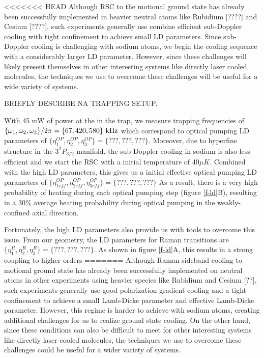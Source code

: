 \documentclass[aps,prl,twocolumn,groupedaddress]{revtex4-1}
\begin{document}
<<<<<<< HEAD
Although RSC to the motional ground state has already been successfully
implemented in heavier neutral atoms like Rubidium [????]
and Cesium [????], such experiments generally use combine efficient sub-Doppler cooling
with tight confinement to achieve small LD parameters.
Since sub-Doppler cooling is challenging with sodium atoms, we begin the cooling sequence with a considerably larger LD parameter.  However, since these challenges will likely present themselves in other interesting systems like directly laser cooled molecules, the techniques we use to overcome these challenges will be useful for a wide variety of systems.

BRIEFLY DESCRIBE NA TRAPPING SETUP.


With 45 mW of power at the in the trap, we measure trapping frequencies of
$\{\omega_1,\omega_2,\omega_3\}/2\pi = \{67, 420, 580\}\ \text{\text{kHz}}$
which correspond to optical pumping LD parameters of
$\{\eta^{OP}_1,\eta^{OP}_2,\eta^{OP}_3\} = \{???, ???, ???\}$.
Moreover, due to hyperfine structure in the $3^2P_{3/2}$ manifold,
the sub-Doppler cooling in sodium is also less efficient and we start the
RSC with a initial temperature of $40\mu K$. Combined with the high LD
parameters, this gives us a initial effective optical pumping LD parameters of
$\{\eta^{OP}_{1eff},\eta^{OP}_{2eff},\eta^{OP}_{3eff}\} = \{???, ???, ???\}$
As a result, there is a very high probability of heating during each optical pumping step
(figure \ref{f-ld}B), resulting in a $30\%$ average heating probability during optical pumping
in the weakly-confined axial direction. 

Fortunately, the high LD parameters also
provide us with tools to overcome this issue. From our geometry, the LD parameters for
Raman transitions are $\{\eta^R_{1},\eta^R_{2},\eta^R_{3}\} = \{???, ???, ???\}$. As shown in
figure \ref{f-ld}A, this results in a strong coupling to higher orders
=======
Although Raman sideband cooling to motional ground state has already been successfully
implemented on neutral atoms in other experiments using heavier species like Rubidium
\cite{Thompson2013,Kaufman2012}
and Cesium [??], such experiments generally use good polarization gradient cooling
and a tight confinement to achieve a small Lamb-Dicke parameter and effective Lamb-Dicke parameter.
However, this regime is harder to achieve with sodium atoms, creating additional challenges for
us to realize ground state cooling. On the other hand, since these conditions can also be difficult
to meet for other interesting systems like directly laser cooled molecules, the techniques we
use to overcome these challenges could be useful for a wider variety of systems.
\end{document}

